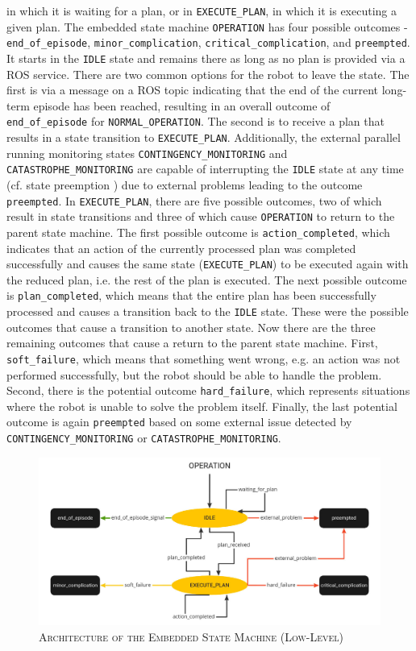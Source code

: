 \documentclass[english, master, utf8]{base/thesis_KBS}
\newcommand{\code}[1]{\colorbox{light-gray}{\texttt{#1}}}
\begin{document}
in which it is waiting for a plan, or in \code{EXECUTE\_PLAN}, in which it is executing a given plan. The embedded state machine \code{OPERATION} has 
four possible outcomes - \code{end\_of\_episode}, \code{minor\_complication}, \code{critical\_complication}, and \code{preempted}. 
It starts in the \code{IDLE} state and remains there as long as no plan is provided via a ROS service.
There are two common options for the robot to leave the state. The first is via a message on a ROS topic indicating that the end of the current long-term episode
has been reached, resulting in an overall outcome of \code{end\_of\_episode} for \code{NORMAL\_OPERATION}. The second is to receive a plan that results in a state
transition to \code{EXECUTE\_PLAN}. Additionally, the external parallel running monitoring states \code{CONTINGENCY\_MONITORING} and \code{CATASTROPHE\_MONITORING}
are capable of interrupting the \code{IDLE} state at any time (cf. state preemption \cite{state_preemption}) due to external problems leading to the outcome \code{preempted}.
In \code{EXECUTE\_PLAN}, there are five possible outcomes, two of which result in state transitions and three of which cause \code{OPERATION} 
to return to the parent state machine. The first possible outcome is \code{action\_completed}, which indicates that an action of the currently processed plan was 
completed successfully and causes the same state (\code{EXECUTE\_PLAN}) to be executed again with the reduced plan, i.e. the rest of the plan is executed.
The next possible outcome is \code{plan\_completed}, which means that the entire plan has been successfully processed and causes a transition back to the \code{IDLE} state.
These were the possible outcomes that cause a transition to another state. Now there are the three remaining outcomes that cause a return to the parent state machine. 
First, \code{soft\_failure}, which means that something went wrong, e.g. an action was not performed successfully, but the robot should be able to handle the problem. 
Second, there is the potential outcome \code{hard\_failure}, which represents situations where the robot is unable to solve the problem itself.
Finally, the last potential outcome is again \code{preempted} based on some external issue detected by \code{CONTINGENCY\_MONITORING} or \code{CATASTROPHE\_MONITORING}.
\begin{figure}[H]
    \centering
    \includegraphics[width=\textwidth]{pics/SMACH_low_level_pretty.jpg}
    \caption{\textsc{Architecture of the Embedded State Machine (Low-Level)}}
    \label{fig:low_level_smach}
\end{figure}
\end{document}
